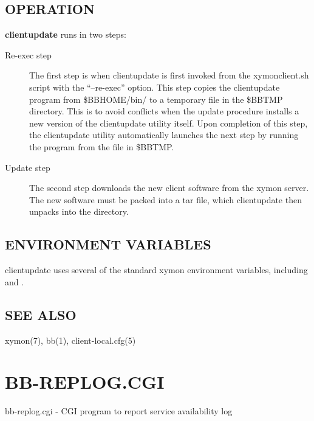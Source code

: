 \subsection{OPERATION}
\textbf{clientupdate}
 runs in two steps: 

 \begin{description}
\item[Re-exec step] The first step is when clientupdate is first invoked from the xymonclient.sh script with the ``--re-exec'' option. This step copies the clientupdate program from \$BBHOME/bin/ to a temporary file in the \$BBTMP directory. This is to avoid conflicts when the update procedure installs a new version of the clientupdate utility itself. Upon completion of this step, the clientupdate utility automatically launches the next step by running the program from the file in \$BBTMP. 

 

\item[Update step] The second step downloads the new client software from the xymon server. The new software must be packed into a tar file, which clientupdate then unpacks into the  directory. 

 


\end{description}

\subsection{ENVIRONMENT VARIABLES}
 clientupdate uses several of the standard xymon environment variables, including 
 and 
. 

 
\subsection{SEE ALSO}
xymon(7), bb(1), client-local.cfg(5) 



  
%
%



\newpage
\section{BB-REPLOG.CGI}

 bb-replog.cgi - CGI program to report service availability log 


